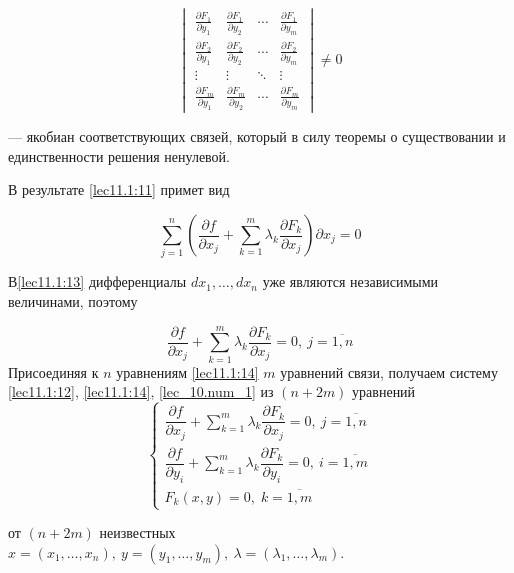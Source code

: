 \documentclass[../../main.tex]{subfiles}
\begin{document}
	\[
	\begin{vmatrix}
	\frac{\partial F_1}{\partial y_1} & \frac{\partial F_1}{\partial y_2}
	& \cdots & \frac{\partial F_1}{\partial y_m} \\
	\frac{\partial F_2}{\partial y_1} & \frac{\partial F_2}{\partial y_2} 
	& \cdots & \frac{\partial F_2}{\partial y_m} \\
	\vdots  & \vdots  & \ddots & \vdots  \\
	\frac{\partial F_m}{\partial y_1} & \frac{\partial F_m}{\partial y_2}
	& \cdots & \frac{\partial F_m}{\partial y_m}
	\end{vmatrix} \ne 0
	\]
	
    --- якобиан соответствующих связей, который в силу теоремы о существовании
	и единственности решения ненулевой.
	
	В результате \eqref{lec11.1:11} примет вид
	
	\begin{equation}
	\label{lec11.1:13}
	\sum\limits_{j=1}^{n}\left(  \dfrac{\partial f }{\partial x_j} + 
	\sum\limits_{k=1}^{m} \lambda_k\dfrac{\partial F_k }{\partial x_j}  
	\right) \partial x_j =0 
	\end{equation}
	
	В\eqref{lec11.1:13} дифференциалы
	$d x_1,\ldots,d x_n$ уже являются независимыми величинами, поэтому
	
	\begin{equation}
	\label{lec11.1:14}
	\dfrac{\partial f }{\partial x_j} + \sum\limits_{k=1}^{m}
	\lambda_k \dfrac{\partial F_k }{\partial x_j} = 0,\ j = \overline{1, n}
	\end{equation}
	Присоединяя к $n$ уравнениям \eqref{lec11.1:14} $m$
	уравнений связи, получаем систему
	\eqref{lec11.1:12},
	\eqref{lec11.1:14},
	\eqref{lec_10.num_1}
	из $ \left( n + 2m \right) $ уравнений
	\[
	\begin{cases}
	\dfrac{\partial f }{\partial x_j} + \sum\limits_{k=1}^{m}
	\lambda_k \dfrac{\partial F_k }{\partial x_j} = 0,\ j = \overline{1, n}\\
	\dfrac{\partial f}{\partial y_i} + \sum\limits_{k = 1}^m \lambda_k 
	\dfrac{\partial F_k}{\partial y_i} = 0,\ i = \overline{1,m} \\
	F_k\left( x, y \right) = 0,\; k = \overline{1, m}
	\end{cases}
	\]
	
	от $ \left( n + 2m \right) $ неизвестных $x = \left( x_1, \ldots, x_n \right),\ 
	y = \left( y_1, \ldots, y_m \right),\ \lambda = \left( \lambda_1,
	\ldots, \lambda_m \right) $.
	
\end{document}
